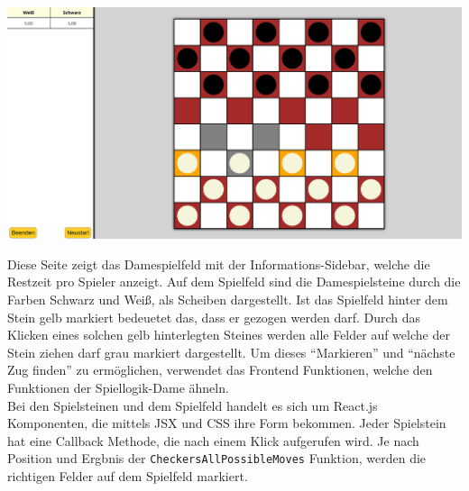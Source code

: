 \documentclass[12pt,a4paper,bibliography=totocnumbered,listof=totocnumbered]{article}
\begin{document}
\vspace{1em}
\begin{minipage}{\linewidth}
	\centering
	\includegraphics[width=0.7\linewidth]{pics/DameWebsiteSpiel.png}
	\label{fig:DameSpielSeite}
\end{minipage}

Diese Seite zeigt das Damespielfeld mit der Informations-Sidebar, welche die Restzeit pro Spieler anzeigt.
Auf dem Spielfeld sind die Damespielsteine durch die Farben Schwarz und Weiß, als Scheiben dargestellt. 
Ist das Spielfeld hinter dem Stein gelb markiert bedeuetet das, dass er gezogen werden darf. 
Durch das Klicken eines solchen gelb hinterlegten Steines werden alle Felder auf welche der Stein ziehen darf 
grau markiert dargestellt. Um dieses ``Markieren'' und ``nächste Zug finden'' zu ermöglichen, verwendet das Frontend Funktionen,
welche den Funktionen der Spiellogik-Dame ähneln.
\\
Bei den Spielsteinen und dem Spielfeld handelt es sich um React.js Komponenten, die mittels JSX und CSS ihre Form bekommen.
Jeder Spielstein hat eine Callback Methode, die nach einem Klick aufgerufen wird. Je nach Position und 
Ergbnis der \texttt{CheckersAllPossibleMoves} Funktion, werden die richtigen Felder auf dem Spielfeld markiert.
\end{document}
